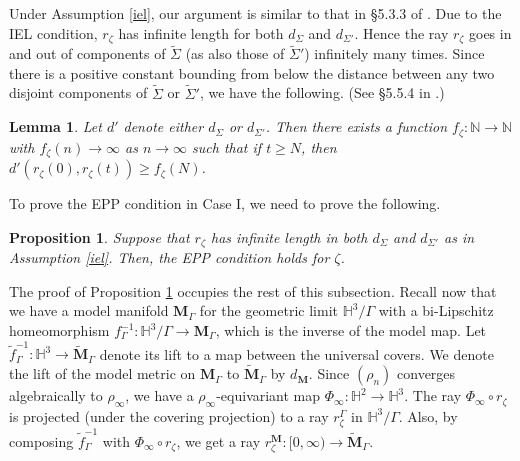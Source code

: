 \documentclass{amsart}
\newtheorem{definition}[theorem]{Definition}
\newtheorem{proposition}[theorem]{Proposition}
\newtheorem{lemma}[theorem]{Lemma}
\theoremstyle{definition}
\newcommand{\naturals}{\mathbb{N}}
\newcommand\HHH{{\mathbb H}}
\begin{document}
Under Assumption \ref{iel}, our argument is similar to that in \S 5.3.3 of \cite{mahan-series2}.
Due to the IEL condition,  $r_\zeta$ has infinite length for both $d_\Sigma$ and $d_{\Sigma'}$. Hence the ray
$r_\zeta$ goes in and out of components of $\widetilde \Sigma$ (as also those of $\widetilde \Sigma'$) infinitely many times.
Since there is a positive constant bounding  from below the distance between any two disjoint components of $\widetilde \Sigma$ or $\widetilde \Sigma'$, we have the following.
(See \S 5.5.4 in  \cite{mahan-series2}.)

\begin{lemma}
\label{electric EP}
Let $d'$ denote either $d_\Sigma$ or $d_{\Sigma'}$.
Then there exists a function $f_\zeta: \naturals \rightarrow \naturals$ with $f_\zeta(n) \rightarrow \infty$ as $n \rightarrow \infty$ such that if $t \geq N$, then $d'(r_\zeta(0), r_\zeta(t)) \geq f_\zeta(N)$.
\end{lemma}

To prove the EPP  condition in Case I, we need to prove the following.
%
\begin{proposition}
\label{EPP infinite}
Suppose that $r_\zeta$ has infinite length in both $d_\Sigma$ and $d_{\Sigma'}$ as in Assumption \ref{iel}.
Then, the  EPP condition holds for $\zeta$.
\end{proposition}

The proof of Proposition \ref{EPP infinite} occupies the rest of this subsection.
Recall now that we have a model manifold $\mathbf M_\Gamma$ for the geometric limit $\HHH^3/\Gamma$ with a bi-Lipschitz  homeomorphism $f_\Gamma^{-1}: \HHH^3/\Gamma \to \mathbf M_\Gamma$, which is the inverse of the model map. Let $\tilde f_\Gamma^{-1}: \HHH^3 \to \widetilde{\mathbf M}_\Gamma$ denote its lift to
a map between the universal covers.
We denote the lift of the model metric on $\mathbf M_\Gamma$ to $\widetilde{\mathbf M}_\Gamma$ by $d_{\mathbf M}$.
Since $(\rho_n)$ converges algebraically to $\rho_\infty$, we have  a $\rho_\infty$-equivariant map $\Phi_\infty : \HHH^2 \rightarrow \HHH^3$.
The ray $\Phi_\infty \circ r_\zeta$  is projected (under the covering projection)  to a ray $r_\zeta^\Gamma$ in $\HHH^3/\Gamma$. 
Also, by composing  $\tilde f_\Gamma^{-1}$ with $\Phi_\infty \circ r_\zeta$, we get a  ray $r_\zeta^{\mathbf M}: [0,\infty) \rightarrow \widetilde{\mathbf M}_\Gamma$.\\
\end{document}
